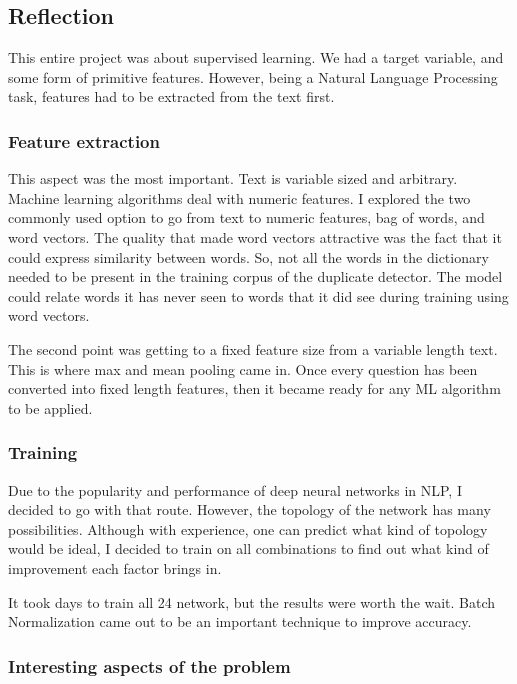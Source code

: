 \documentclass{article}
\begin{document}
\subsection{Reflection}

This entire project was about supervised learning. We had a target variable, and some form of primitive features. However, being a Natural Language Processing task, features had to be extracted from the text first.

\subsubsection{Feature extraction}

This aspect was the most important. Text is variable sized and arbitrary. Machine learning algorithms deal with numeric features. I explored the two commonly used option to go from text to numeric features, bag of words, and word vectors. The quality that made word vectors attractive was the fact that it could express similarity between words. So, not all the words in the dictionary needed to be present in the training corpus of the duplicate detector. The model could relate words it has never seen to words that it did see during training using word vectors.

The second point was getting to a fixed feature size from a variable length text. This is where max and mean pooling came in. Once every question has been converted into fixed length features, then it became ready for any ML algorithm to be applied.

\subsubsection{Training}

Due to the popularity and performance of deep neural networks in NLP, I decided to go with that route. However, the topology of the network has many possibilities. Although with experience, one can predict what kind of topology would be ideal, I decided to train on all combinations to find out what kind of improvement each factor brings in.

It took days to train all 24 network, but the results were worth the wait. Batch Normalization came out to be an important technique to improve accuracy.

\subsubsection{Interesting aspects of the problem}
\end{document}

